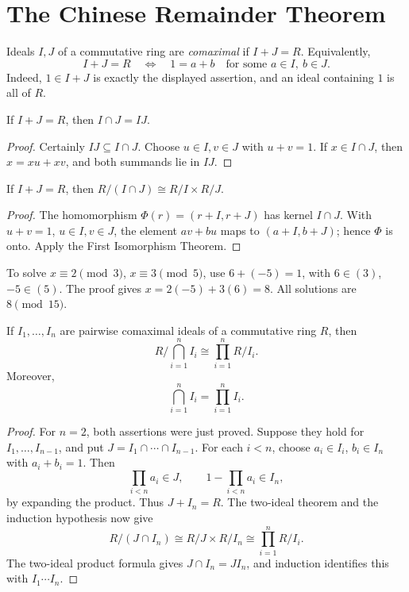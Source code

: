 \section{The Chinese Remainder Theorem}
\begin{definition}
Ideals \(I,J\) of a commutative ring are \emph{comaximal} if \(I+J=R\).
Equivalently,
\[
I+J=R\quad\Longleftrightarrow\quad 1=a+b
\quad\text{for some }a\in I,\ b\in J.
\]
Indeed, \(1\in I+J\) is exactly the displayed assertion, and an ideal
containing \(1\) is all of \(R\).
\end{definition}
\begin{lemma}
If \(I+J=R\), then \(I\cap J=IJ\).
\end{lemma}
\begin{proof}
Certainly \(IJ\subseteq I\cap J\). Choose \(u\in I,v\in J\) with
\(u+v=1\). If \(x\in I\cap J\), then \(x=xu+xv\), and both summands lie in
\(IJ\).
\end{proof}
\begin{theorem}
If \(I+J=R\), then \(R/(I\cap J)\cong R/I\times R/J\).
\end{theorem}
\begin{proof}
The homomorphism \(\Phi(r)=(r+I,r+J)\) has kernel \(I\cap J\). With
\(u+v=1\), \(u\in I,v\in J\), the element \(av+bu\) maps to
\((a+I,b+J)\); hence \(\Phi\) is onto. Apply the First Isomorphism Theorem.
\end{proof}
\begin{example}
To solve \(x\equiv2\pmod3\), \(x\equiv3\pmod5\), use
\(6+(-5)=1\), with \(6\in(3)\), \(-5\in(5)\). The proof gives
\(x=2(-5)+3(6)=8\). All solutions are \(8\pmod {15}\).
\end{example}
\begin{theorem}
If \(I_1,\ldots,I_n\) are pairwise comaximal ideals of a commutative ring
\(R\), then
\[
R/\bigcap_{i=1}^n I_i\cong\prod_{i=1}^n R/I_i.
\]
Moreover,
\[
\bigcap_{i=1}^n I_i=\prod_{i=1}^n I_i.
\]
\end{theorem}
\begin{proof}
For \(n=2\), both assertions were just proved.  Suppose they hold for
\(I_1,\ldots,I_{n-1}\), and put \(J=I_1\cap\cdots\cap I_{n-1}\).  For each
\(i<n\), choose \(a_i\in I_i\), \(b_i\in I_n\) with \(a_i+b_i=1\).
Then
\[
\prod_{i<n}a_i\in J,
\qquad
1-\prod_{i<n}a_i\in I_n,
\]
by expanding the product. Thus \(J+I_n=R\).
The two-ideal theorem and the induction hypothesis now give
\[
R/(J\cap I_n)\cong R/J\times R/I_n
\cong\prod_{i=1}^n R/I_i.
\]
The two-ideal product formula gives
\(J\cap I_n=JI_n\), and induction identifies this with
\(I_1\cdots I_n\).
\end{proof}

